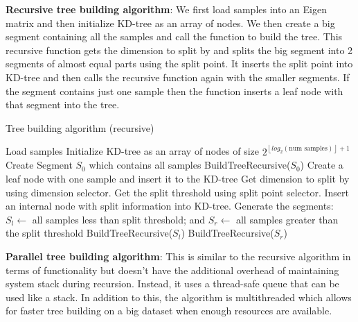 \documentclass[11pt]{amsart}
\begin{document}
\begin{list}{}{\leftmargin= 1.4cm} \setlength\itemsep{1em}
\item\textbf{Recursive tree building algorithm}:  We first load samples into an Eigen matrix and then initialize KD-tree as an array of nodes. We then create a big segment containing all the samples and call the function  to build the tree. This recursive function gets the dimension to split by and splits the big segment into 2 segments of almost equal parts using the split point. It inserts the split point into KD-tree and then calls the recursive function again with the smaller segments. If the segment contains just one sample then the function inserts a leaf node with that segment into the tree.

\begin{algorithm}[!t]
\caption{Tree building algorithm (recursive)}
\label{tree_building_recursive}
\begin{algorithmic}[1]
\State Load samples
\State Initialize KD-tree as an array of nodes of size $2^{\left \lfloor{log_{2}(\text{num samples})}\right \rfloor + 1 }$ 
\State Create Segment $S_0$ which contains all samples
\State 
\State BuildTreeRecursive($S_0$)
\State 
{}
\State Create a leaf node with one sample and insert it to the KD-tree
\Else
\State Get dimension to split by using dimension selector.
\State Get the split threshold using split point selector.
\State Insert an internal node with split information into KD-tree.
\State
\State Generate the segments:
\State $S_l \gets $ all samples less than split threshold; and
\State $S_r \gets $  all samples greater than the split threshold
\State
\State BuildTreeRecursive($S_l$)
\State BuildTreeRecursive($S_r$)
\EndIf
\EndProcedure
\end{algorithmic}
\end{algorithm}


\item\textbf{Parallel tree building algorithm}: This is similar to the recursive algorithm in terms of functionality but doesn't have the additional overhead of maintaining system stack during recursion. Instead, it uses a thread-safe queue that can be used like a stack. In addition to this, the algorithm is multithreaded which allows for faster tree building on a big dataset when enough resources are available.


\end{list}
\end{document}
